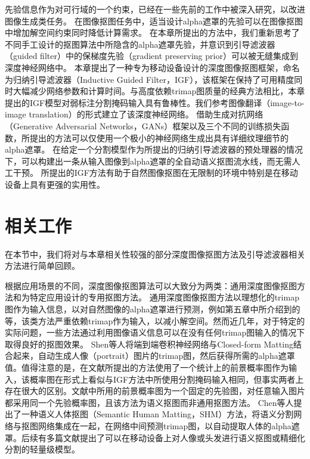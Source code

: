 先验信息作为对可行域的一个约束，已经在一些先前的工作中被深入研究，以改进图像生成类任务\cite{ulyanov2018deep}。
在图像抠图任务中，适当设计alpha遮罩的先验可以在图像抠图中增加解空间约束同时降低计算需求。
在本章所提出的方法中，我们重新思考了不同手工设计的抠图算法中所隐含的alpha遮罩先验，并意识到引导滤波器（guided filter）\cite{he2010guided}中的保梯度先验（gradient preserving prior）可以被无缝集成到深度神经网络中。
本章提出了一种专为移动设备设计的深度图像抠图框架，命名为归纳引导滤波器（Inductive Guided Filter，IGF），该框架在保持了可用精度同时大幅减少网络参数和计算时间。与高度依赖trimap图质量的经典方法相比，本章提出的IGF模型对弱标注分割掩码输入具有鲁棒性。我们参考图像翻译（image-to-image translation）的形式建立了该深度神经网络。
借助生成对抗网络（Generative Adversarial Networks，GANs）框架以及三个不同的训练损失函数，所提出的方法可以仅使用一个极小的神经网络生成出具有详细纹理细节的alpha遮罩。
在给定一个分割模型作为所提出的归纳引导滤波器的预处理器的情况下，可以构建出一条从输入图像到alpha遮罩的全自动语义抠图流水线，而无需人工干预。
所提出的IGF方法有助于自然图像抠图在无限制的环境中特别是在移动设备上具有更强的实用性。

\section{相关工作}
在本节中，我们将对与本章相关性较强的部分深度图像抠图方法及引导滤波器相关方法进行简单回顾。

根据应用场景的不同，深度图像抠图算法可以大致分为两类：通用深度图像抠图方法和为特定应用设计的专用抠图方法。
通用深度图像抠图方法以理想化的trimap图作为输入信息，以对自然图像的alpha遮罩进行预测，例如第五章中所介绍到的\parencite{cho2019deep,xu2017deep,lutz2018alphagan,cai2019disentangled,lu2019indices,hou2019context,samplenet}等，该类方法严重依赖trimap作为输入，以减小解空间。然而近几年，对于特定的实际问题，一些方法通过利用图像语义信息可以在没有任何trimap图输入的情况下取得良好的抠图效果。
Shen等人\cite{shen2016deep}将端到端卷积神经网络与Closed-form Matting\cite{levin2008closed}结合起来，自动生成人像（portrait）图片的trimap图，然后获得所需的alpha遮罩值。值得注意的是，在文献\parencite{shen2016deep}所提出的方法使用了一个统计上的前景概率图作为输入，该概率图在形式上看似与IGF方法中所使用分割掩码输入相同，但事实两者上存在很大的区别。文献\parencite{shen2016deep}中所用的前景概率图为一个固定的先验图，对任意输入图片都采用同一个先验概率图，且该方法为语义抠图而非通用抠图方法。
Chen等人\cite{chen2018semantic}提出了一种语义人体抠图（Semantic Human Matting，SHM）方法，将语义分割网络与抠图网络集成在一起，在网络中间预测trimap图，以自动提取人体的alpha遮罩。后续有多篇文献\cite{zhu2017fast,levinshtein2018real,chen2019boundary}提出了可以在移动设备上对人像或头发进行语义抠图或精细化分割的轻量级模型。

